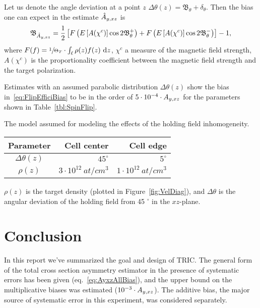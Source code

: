 \documentclass{article}
\newcommand{\bias}[1]{\mathfrak{B}_{#1}}
\newcommand{\rand}[1]{\delta_{#1}}
\begin{document}
Let us denote the angle deviation at a point $z$ $\Delta\theta(z) = \bias{\theta} + \rand{\theta}$. Then the bias one can expect in the estimate $\Ayxz*$ is~\cite{Diploma}
\begin{equation}\label{eq:FlipEfficiBias}
	\bias{\Ayxz*} = \frac{1}{2}\bkt*{F\bkt{\Xpct{A(\chi^c)}\cos2\bias{\theta}^+} + F\bkt{\Xpct{A(\chi^c)}\cos2\bias{\theta}^-}} - 1,
\end{equation}
where $F(f) = \sfrac{1}{\Thick[T]}\cdot\int_{\Lcell}\rho(z) f(z)~ \td z$, $\chi^c$ a measure of the magnetic field strength, $A(\chi^c)$ is the proportionality coefficient between the magnetic field strength and the target polarization.

Estimates with an assumed parabolic distribution $\Delta\theta(z)$ show the bias in~\eqref{eq:FlipEfficiBias} to be in the order of $5\cdot 10^{-4}\cdot\Ayxz$ for the parameters shown in Table~\ref{tbl:SpinFlip}.~\cite{Diploma} 

\begin{center}
	\begin{threeparttable}
		\centering
		\caption{The model assumed for modeling the effects of the holding field inhomogeneity. \label{tbl:SpinFlip}}
		\begin{tabular}{crr}
			\hline\hline
			Parameter     &              Cell center &                Cell edge \\ \hline
			$\Delta\theta(z)$ &               $45^\circ$ &                $5^\circ$ \\
			$\rho(z)$     & $3\cdot10^{12}~ at/cm^3$ & $1\cdot 10^{12}~at/cm^3$ \\ \hline
		\end{tabular}
		\begin{tablenotes}
			\item $\rho(z)$ is the target density (plotted in Figure~\ref{fig:VelDiag}), and $\Delta\theta$ is the angular deviation of the holding field from 45 $^\circ$ in the $xz$-plane.
		\end{tablenotes}
	\end{threeparttable}
\end{center}



\section*{Conclusion}
In this report we've summarized the goal and design of TRIC. The general form of the total cross section asymmetry estimator in the presence of systematic errors has been given (eq.~\eqref{eq:AyxzAllBias}), and the upper bound on the multiplicative biases was estimated ($10^{-3}\cdot\Ayxz$). The additive bias, the major source of systematic error in this experiment, was considered separately. 
\end{document}
